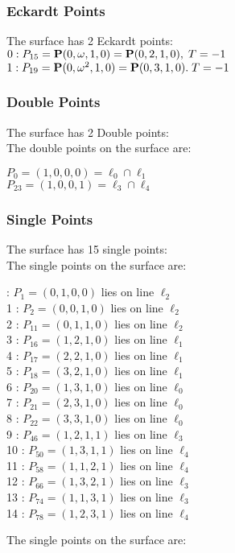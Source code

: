 \documentclass{article}
\newcommand{\bP}{{\bf P}}
\begin{document}
{\subsubsection*{Eckardt Points}
The surface has 2 Eckardt points:\\
$0 : P_{15}=\bP(0, \omega , 1, 0) = \bP(0, 2, 1, 0),\; T= -1$\\
$1 : P_{19}=\bP(0, \omega^{2}, 1, 0) = \bP(0, 3, 1, 0).\; T= -1$\\
\subsubsection*{Double Points}
The surface has 2 Double points:\\
The double points on the surface are:\\
\begin{multicols}{2}
\noindent
$P_{0} = ( 1, 0, 0, 0 ) = \ell_{0} \cap \ell_{1} $\\
$P_{23} = ( 1, 0, 0, 1 ) = \ell_{3} \cap \ell_{4} $\\
\end{multicols}
\subsubsection*{Single Points}
The surface has 15 single points:\\
The single points on the surface are:\\
\begin{multicols}{2}
 : $P_{1}=( 0, 1, 0, 0 )$ lies on line $\ell_{2}$\\
1 : $P_{2}=( 0, 0, 1, 0 )$ lies on line $\ell_{2}$\\
2 : $P_{11}=( 0, 1, 1, 0 )$ lies on line $\ell_{2}$\\
3 : $P_{16}=( 1, 2, 1, 0 )$ lies on line $\ell_{1}$\\
4 : $P_{17}=( 2, 2, 1, 0 )$ lies on line $\ell_{1}$\\
5 : $P_{18}=( 3, 2, 1, 0 )$ lies on line $\ell_{1}$\\
6 : $P_{20}=( 1, 3, 1, 0 )$ lies on line $\ell_{0}$\\
7 : $P_{21}=( 2, 3, 1, 0 )$ lies on line $\ell_{0}$\\
8 : $P_{22}=( 3, 3, 1, 0 )$ lies on line $\ell_{0}$\\
9 : $P_{46}=( 1, 2, 1, 1 )$ lies on line $\ell_{3}$\\
10 : $P_{50}=( 1, 3, 1, 1 )$ lies on line $\ell_{4}$\\
11 : $P_{58}=( 1, 1, 2, 1 )$ lies on line $\ell_{4}$\\
12 : $P_{66}=( 1, 3, 2, 1 )$ lies on line $\ell_{3}$\\
13 : $P_{74}=( 1, 1, 3, 1 )$ lies on line $\ell_{3}$\\
14 : $P_{78}=( 1, 2, 3, 1 )$ lies on line $\ell_{4}$\\
\end{multicols}
The single points on the surface are:\\
}
\end{document}
